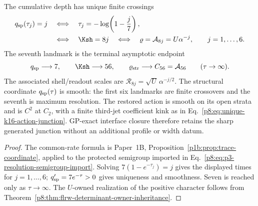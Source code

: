 \documentclass[12pt,a4paper]{article}
\begin{document}
\begin{theorem}
\label{p8:thm:homogeneous-seven-resolution-landmarks}
The cumulative depth has unique finite crossings
\begin{equation}
\label{p8:eq:seven-resolution-landmark-ledger}
\begin{aligned}
 q_{\rm sp}(\tau_j)=j
 &\quad\Longleftrightarrow\quad
 \tau_j=-\log\!\left(1-\frac j7\right),\\
 &\quad\Longleftrightarrow\quad
 \Ksh=8j
 \quad\Longleftrightarrow\quad
 \varrho=\mathcal A_{8j}=U\alpha^{-j},
 \qquad j=1,\ldots,6.
\end{aligned}
\end{equation}
The seventh landmark is the terminal asymptotic endpoint
\begin{equation}
 q_{\rm sp}\longrightarrow7,
 \qquad
 \Ksh\longrightarrow56,
 \qquad
 \varrho_{\rm str}\longrightarrow C_{56}=\mathcal A_{56}
 \qquad(\tau\to\infty).
\end{equation}
The associated shell/readout scales are
\(\mathcal R_{8j}=\sqrt U\,\alpha^{-j/2}\).  The structural coordinate
\(q_{\rm sp}(\tau)\) is smooth: the first six landmarks are finite
crossovers and the seventh is maximum resolution.  The restored action is smooth on its open strata and is $C^2$ at $C_2$, with a finite third-jet coefficient kink as in Eq.~\eqref{p8:eq:unique-k16-action-junction}.  GP-exact interface closure
therefore retains the sharp generated junction without an additional profile
or width datum.
\end{theorem}

\begin{proof}
The common-rate formula is Paper~1B,
Proposition~\ref{p1b:prop:trace-coordinate}, applied to the protected
semigroup imported in Eq.~\eqref{p8:eq:p3-resolution-semigroup-import}.
Solving \(7(1-e^{-\tau_j})=j\) gives the displayed times for
\(j=1,\ldots,6\); \(q_{\rm sp}'=7e^{-\tau}>0\) gives uniqueness and
smoothness.  Seven is reached only as \(\tau\to\infty\).
The \(U\)-owned realization of the positive character follows from
Theorem~\ref{p8:thm:flrw-determinant-owner-inheritance}.
\end{proof}
\end{document}
